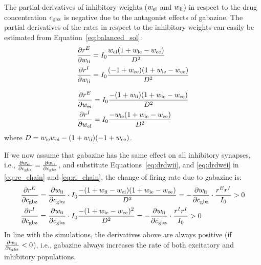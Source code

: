     The partial derivatives of inhibitory weights ($w_{\rm ei}$ and $w_{\rm
    ii}$) in respect to the drug concentration $c_{\rm gbz}$ is negative due to
    the antagonist  effects of gabazine. The partial derivatives of the rates
    in respect to the inhibitory weights can easily be estimated from
    Equation~\ref{eq:balanced_sol}:
    \begin{equation}
      \begin{split}
        \frac{\partial r^E}{\partial w_{\rm ii}} &= 
              I_0 \frac{w_{\rm ei} (1 + w_{\rm ie} - w_{\rm ee})} {D^2} \\
        \frac{\partial r^I}{\partial w_{\rm ii}} &=
              I_0 \frac{(-1 + w_{\rm ee})(1 + w_{\rm ie} - w_{\rm ee})} {D^2} \\
      \end{split}
      \label{eq:drdwii}
    \end{equation}

    \begin{equation}
      \begin{split}
        \frac{\partial r^E}{\partial w_{\rm ei}} &=
              I_0 \frac{-(1 + w_{\rm ii}) (1 + w_{\rm ie} - w_{\rm ee})} {D^2} \\
        \frac{\partial r^I}{\partial w_{\rm ei}} &=
              I_0 \frac{-w_{\rm ie} (1 + w_{\rm ie} - w_{\rm ee})} {D^2} \\
      \end{split}
      \label{eq:drdwei}
    \end{equation}
    where $D=w_{\rm ie}w_{\rm ei} - (1+w_{\rm ii})(-1+w_{\rm ee})$.
    
    If we now assume that gabazine has the same effect on all inhibitory
    synapses, i.e., $\frac{\partial w_{\rm ei}}{\partial c_{\rm gbz}} =
    \frac{\partial w_{\rm ii}}{\partial c_{\rm gbz}}$, and substitute
    Equations~\ref{eq:drdwii}, and \ref{eq:drdwei} in \ref{eq:re_chain} and
    \ref{eq:ri_chain}, the change of firing rate due to gabazine is:
    \begin{equation}
      \begin{split}
        \frac{\partial r^E}{\partial c_{\rm gbz}} &=
            \frac{\partial w_{\rm ii}}{\partial c_{\rm gbz}} \cdot
            I_0 \frac{-(1 + w_{\rm ii} - w_{\rm ei}) (1 + w_{\rm ie} - w_{\rm ee})} {D^2} =
            - \frac{\partial w_{\rm ii}}{\partial c_{\rm gbz}} \cdot \frac{r^E r^I}{I_0} > 0 \\
        \frac{\partial r^I}{\partial c_{\rm gbz}} &=
            \frac{\partial w_{\rm ii}}{\partial c_{\rm gbz}} \cdot
            I_0 \frac{- (1 + w_{\rm ie} - w_{\rm ee})^2} {D^2} =
            - \frac{\partial w_{\rm ii}}{\partial c_{\rm gbz}} \cdot \frac{r^I r^I}{I_0} > 0 \\
      \end{split}
    \end{equation}
    In line with the simulations, the derivatives above are always positive (if
    $\frac{\partial w_{\rm ii}}{\partial c_{\rm gbz}} < 0 $), i.e., gabazine
    always increases the rate of both excitatory and inhibitory
    populations. 

